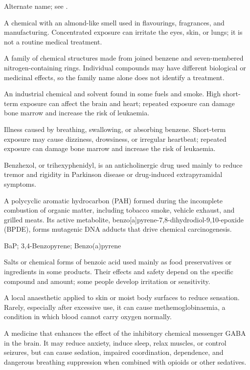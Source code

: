 Alternate name; see .

 A chemical with an almond-like smell used in flavourings, fragrances, and manufacturing. Concentrated exposure can irritate the eyes, skin, or lungs; it is not a routine medical treatment.

 A family of chemical structures made from joined benzene and seven-membered nitrogen-containing rings. Individual compounds may have different biological or medicinal effects, so the family name alone does not identify a treatment.

 An industrial chemical and solvent found in some fuels and smoke. High short-term exposure can affect the brain and heart; repeated exposure can damage bone marrow and increase the risk of leukaemia.

 Illness caused by breathing, swallowing, or absorbing benzene. Short-term exposure may cause dizziness, drowsiness, or irregular heartbeat; repeated exposure can damage bone marrow and increase the risk of leukaemia.

 Benzhexol, or trihexyphenidyl, is an anticholinergic drug used mainly to reduce tremor and rigidity in Parkinson disease or drug-induced extrapyramidal symptoms.

 A polycyclic aromatic hydrocarbon (PAH) formed during the incomplete combustion of organic matter, including tobacco smoke, vehicle exhaust, and grilled meats. Its active metabolite, benzo[a]pyrene-7,8-dihydrodiol-9,10-epoxide (BPDE), forms mutagenic DNA adducts that drive chemical carcinogenesis.

\synonyms
BaP; 3,4-Benzopyrene; Benzo(a)pyrene

 Salts or chemical forms of benzoic acid used mainly as food preservatives or ingredients in some products. Their effects and safety depend on the specific compound and amount; some people develop irritation or sensitivity.

 A local anaesthetic applied to skin or moist body surfaces to reduce sensation. Rarely, especially after excessive use, it can cause methemoglobinaemia, a condition in which blood cannot carry oxygen normally.

 A medicine that enhances the effect of the inhibitory chemical messenger GABA in the brain. It may reduce anxiety, induce sleep, relax muscles, or control seizures, but can cause sedation, impaired coordination, dependence, and dangerous breathing suppression when combined with opioids or other sedatives.

